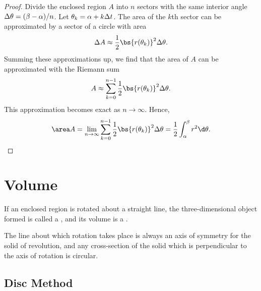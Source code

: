 \begin{proof}
    Divide the enclosed region $A$ into $n$ sectors with the same interior angle $\Delta \theta = (\beta - \alpha)/n$. Let $\theta_k = \alpha + k \Delta t$. The area of the $k$th sector can be approximated by a sector of a circle with area \[\D A \approx \frac12 \bs{r(\t_k)}^2 \D \t.\] Summing these approximations up, we find that the area of $A$ can be approximated with the Riemann sum \[A \approx \sum_{k = 0}^{n-1} \frac12 \bs{r(\t_k)}^2 \D \t.\] This approximation becomes exact as $n \to \infty$. Hence, \[\area A = \lim_{n \to \infty} \sum_{k = 0}^{n-1} \frac12 \bs{r(\t_k)}^2 \D \t = \frac12 \int_{\a}^{\b} r^2 \d \t.\]
\end{proof}

\section{Volume}

\begin{definition}
    If an enclosed region is rotated about a straight line, the three-dimensional object formed is called a , and its volume is a .
\end{definition}

The line about which rotation takes place is always an axis of symmetry for the solid of revolution, and any cross-section of the solid which is perpendicular to the axis of rotation is circular.

\subsection{Disc Method}

